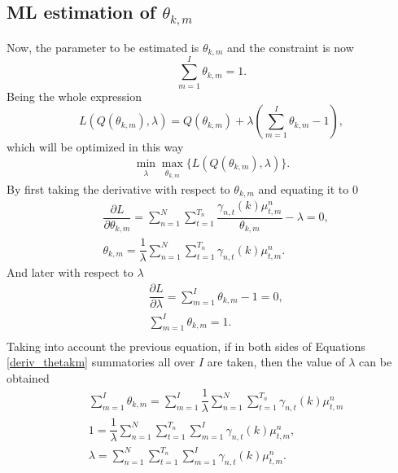 \documentclass[12pt]{article}
\begin{document}
\subsection{ML estimation of $\theta_{k,m}$}
Now, the parameter to be estimated is $\theta_{k,m}$ and the constraint is now
\begin{equation}
\label{constraint_thetakm}
\sum \limits_{m=1}^{I} \theta_{k,m} = 1.
\end{equation}
Being the whole expression
\begin{equation}
\label{lagrange_thetakm}
L\left( Q(\theta_{k,m}),\lambda \right) = Q(\theta_{k,m}) + \lambda \left( \sum \limits_{m=1}^{I} \theta_{k,m} - 1 \right),
\end{equation}
which will be optimized in this way
\begin{equation}
\label{minmax_lagrange_thetakm}
\min_{\substack{\lambda}} \max_{\substack{\theta_{k,m}}} \lbrace L\left( Q(\theta_{k,m}),\lambda \right) \rbrace.
\end{equation}
By first taking the derivative with respect to $\theta_{k,m}$ and equating it to 0
\begin{equation}
\label{deriv_thetakm}
\begin{split}
& \dfrac{\partial L}{\partial \theta_{k,m}} = \sum \limits_{n=1}^{N}\sum _ { t = 1 } ^ { T _ { n } } \dfrac{\gamma_{n,t}(k)\mu_{t,m}^{n}}{\theta_{k,m}} - \lambda  = 0 , \\
& \theta_{k,m} = \dfrac{1}{\lambda} \sum \limits_{n=1}^{N} \sum _ { t = 1 } ^ { T _ { n } }\gamma_{n,t}(k)\mu_{t,m}^{n}.
\end{split}
\end{equation}
And later with respect to $\lambda$
\begin{equation}
\begin{split}
& \dfrac{\partial L}{\partial \lambda} = \sum \limits_{m=1}^{I} \theta_{k,m} - 1 = 0,\\
& \sum \limits_{m=1}^{I} \theta_{k,m} = 1.\\
\end{split}
\end{equation}
Taking into account the previous equation, if in both sides of Equations \ref{deriv_thetakm} summatories all over $I$ are taken, then the value of $\lambda$ can be obtained
\begin{equation}
\begin{split}
& \sum \limits_{m=1}^{I}\theta_{k,m} = \sum \limits_{m=1}^{I} \dfrac{1}{\lambda} \sum \limits_{n=1}^{N}\sum _ { t = 1 } ^ { T _ { n } } \gamma_{n,t}(k)\mu_{t,m}^{n}\\
& 1 = \dfrac{1}{\lambda} \sum \limits_{n=1}^{N}\sum _ { t = 1 } ^ { T _ { n } }\sum \limits_{m=1}^{I}\gamma_{n,t}(k)\mu_{t,m}^{n},\\
& \lambda = \sum \limits_{n=1}^{N}\sum \limits_{ t = 1 } ^ { T _ { n }}\sum \limits_{m=1}^{I}\gamma_{n,t}(k)\mu_{t,m}^{n}.\\
\end{split}
\end{equation}
\end{document}
